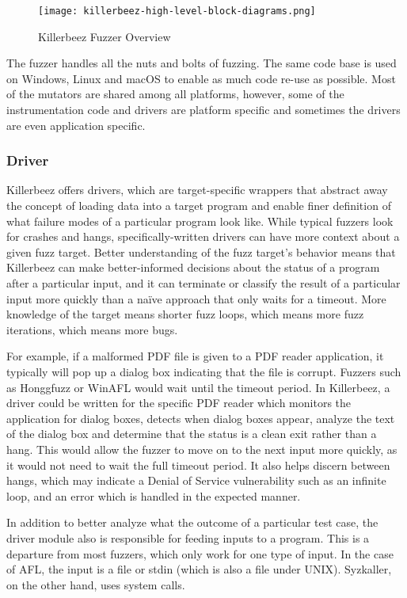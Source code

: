\begin{figure}[hp]
\centering
\texttt{[image: killerbeez-high-level-block-diagrams.png]}
\caption{Killerbeez Fuzzer Overview}
\label{fig:Killerbeez-fuzzer-overview}
\end{figure}
\begin{multicols}{2}

The fuzzer handles all the nuts and bolts of fuzzing. The same code base
is used on Windows, Linux and macOS to enable as much code re-use as possible.
Most of the mutators are shared among all platforms, however, some of the
instrumentation code and drivers are platform specific and sometimes the
drivers are even application specific.

\subsubsection{Driver} \label{Driver Overview}
Killerbeez offers drivers, which are target-specific wrappers that abstract
away the concept of loading data into a target program and enable finer
definition of what failure modes of a particular program look like. While
typical fuzzers look for crashes and hangs, specifically-written drivers can
have more context about a given fuzz target.  Better understanding of the fuzz
target's behavior means that Killerbeez can make better-informed decisions
about the status of a program after a particular input, and it can terminate or
classify the result of a particular input more quickly than a na\"ive approach
that only waits for a timeout. More knowledge of the target means shorter fuzz
loops, which means more fuzz iterations, which means more bugs.

For example, if a malformed PDF file is given to a PDF reader application, it
typically will pop up a dialog box indicating that the file is corrupt. Fuzzers
such as Honggfuzz or WinAFL would wait until the timeout period. In Killerbeez,
a driver could be written for the specific PDF reader which monitors the
application for dialog boxes, detects when dialog boxes appear, analyze the
text of the dialog box and determine that the status is a clean exit rather
than a hang.  This would allow the fuzzer to move on to the next input more
quickly, as it would not need to wait the full timeout period.  It also helps
discern between hangs, which may indicate a Denial of Service vulnerability
such as an infinite loop, and an error which is handled in the expected manner.

In addition to better analyze what the outcome of a particular test case, the
driver module also is responsible for feeding inputs to a program.  This is a
departure from most fuzzers, which only work for one type of input.  In the
case of AFL, the input is a file or stdin (which is also a file under UNIX).
Syzkaller\cite{syzkaller}, on the other hand, uses system calls.


\end{multicols}
